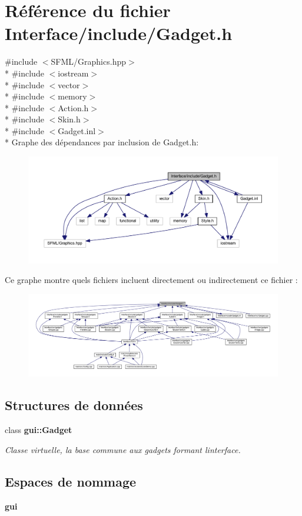 \section{Référence du fichier Interface/include/\+Gadget.h}
\label{_gadget_8h}
{\ttfamily \#include $<$S\+F\+M\+L/\+Graphics.\+hpp$>$}\\*
{\ttfamily \#include $<$iostream$>$}\\*
{\ttfamily \#include $<$vector$>$}\\*
{\ttfamily \#include $<$memory$>$}\\*
{\ttfamily \#include $<$Action.\+h$>$}\\*
{\ttfamily \#include $<$Skin.\+h$>$}\\*
{\ttfamily \#include $<$Gadget.\+inl$>$}\\*
Graphe des dépendances par inclusion de Gadget.\+h\+:\nopagebreak
\begin{figure}[H]
\begin{center}
\leavevmode
\includegraphics[width=350pt]{_gadget_8h__incl}
\end{center}
\end{figure}
Ce graphe montre quels fichiers incluent directement ou indirectement ce fichier \+:\nopagebreak
\begin{figure}[H]
\begin{center}
\leavevmode
\includegraphics[width=350pt]{_gadget_8h__dep__incl}
\end{center}
\end{figure}
\subsection*{Structures de données}
\begin{DoxyCompactItemize}
\item 
class {\bf gui\+::\+Gadget}
\begin{DoxyCompactList}\small\item\em Classe virtuelle, la base commune aux gadgets formant l\textquotesingle{}interface. \end{DoxyCompactList}\end{DoxyCompactItemize}
\subsection*{Espaces de nommage}
\begin{DoxyCompactItemize}
\item 
 {\bf gui}
\end{DoxyCompactItemize}
